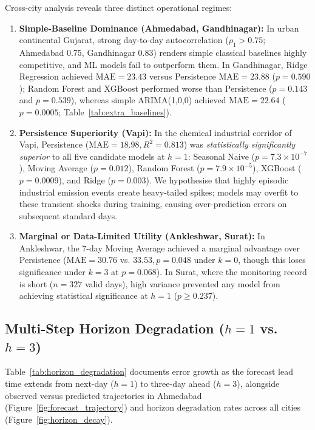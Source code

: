 Cross-city analysis reveals three distinct operational regimes:
\begin{enumerate}
  \item \textbf{Simple-Baseline Dominance (Ahmedabad, Gandhinagar):} In urban continental Gujarat, strong day-to-day autocorrelation ($\rho_1 > 0.75$; Ahmedabad 0.75, Gandhinagar 0.83) renders simple classical baselines highly competitive, and ML models fail to outperform them. In Gandhinagar, Ridge Regression achieved $\text{MAE} = 23.43$ versus Persistence $\text{MAE} = 23.88$ ($p = 0.590$); Random Forest and XGBoost performed worse than Persistence ($p = 0.143$ and $p = 0.539$), whereas simple ARIMA(1,0,0) achieved $\text{MAE} = 22.64$ ($p = 0.0005$; Table~\ref{tab:extra_baselines}).
  \item \textbf{Persistence Superiority (Vapi):} In the chemical industrial corridor of Vapi, Persistence ($\text{MAE} = \mathbf{18.98}, R^2 = 0.813$) was \emph{statistically significantly superior} to all five candidate models at $h=1$: Seasonal Naive ($p = 7.3 \times 10^{-7}$), Moving Average ($p = 0.012$), Random Forest ($p = 7.9 \times 10^{-5}$), XGBoost ($p = 0.0009$), and Ridge ($p = 0.003$). We hypothesise that highly episodic industrial emission events create heavy-tailed spikes; models may overfit to these transient shocks during training, causing over-prediction errors on subsequent standard days.
  \item \textbf{Marginal or Data-Limited Utility (Ankleshwar, Surat):} In Ankleshwar, the 7-day Moving Average achieved a marginal advantage over Persistence ($\text{MAE} = 30.76$ vs. $33.53, p = 0.048$ under $k=0$, though this loses significance under $k=3$ at $p = 0.068$). In Surat, where the monitoring record is short ($n = 327$ valid days), high variance prevented any model from achieving statistical significance at $h=1$ ($p \ge 0.237$).
\end{enumerate}

\subsection{Multi-Step Horizon Degradation (\texorpdfstring{$h=1$ vs. $h=3$}{h=1 vs h=3})}
\label{sec:horizons_results}
Table~\ref{tab:horizon_degradation} documents error growth as the forecast lead time extends from next-day ($h=1$) to three-day ahead ($h=3$), alongside observed versus predicted trajectories in Ahmedabad (Figure~\ref{fig:forecast_trajectory}) and horizon degradation rates across all cities (Figure~\ref{fig:horizon_decay}).

